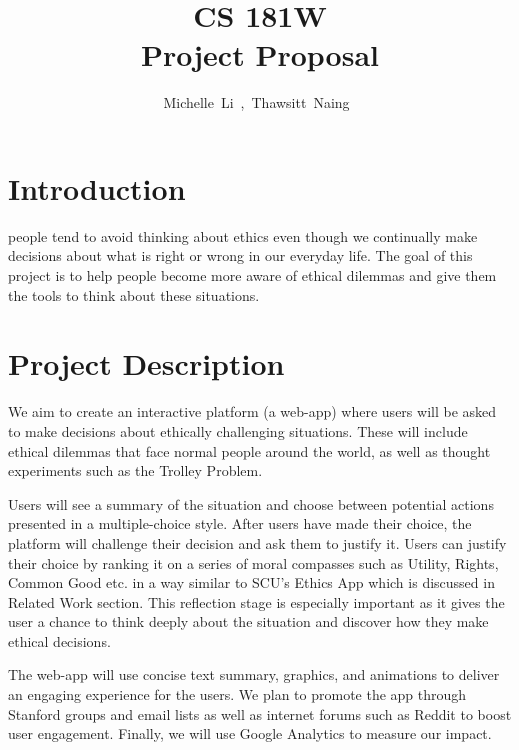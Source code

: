 \documentclass[12pt,journal,compsoc]{IEEEtran}
\begin{document}
\title{CS 181W \\ Project Proposal}

\author{Michelle~Li~,~Thawsitt~Naing~}


%
{}

\maketitle


\section{Introduction}

 people tend to avoid thinking about ethics even though we continually make decisions about what is right or wrong in our everyday life. The goal of this project is to help people become more aware of ethical dilemmas and give them the tools to think about these situations.


\section{Project Description}
We aim to create an interactive platform (a web-app) where users will be asked to make decisions about ethically challenging situations. These will include ethical dilemmas that face normal people around the world, as well as thought experiments such as the Trolley Problem. 

Users will see a summary of the situation and choose between potential actions presented in a multiple-choice style. After users have made their choice, the platform will challenge their decision and ask them to justify it. Users can justify their choice by ranking it on a series of moral compasses such as Utility, Rights, Common Good etc. in a way similar to SCU’s Ethics App which is discussed in Related Work section. This reflection stage is especially important as it gives the user a chance to think deeply about the situation and discover how they make ethical decisions.

The web-app will use concise text summary, graphics, and animations to deliver an engaging experience for the users. We plan to promote the app through Stanford groups and email lists as well as internet forums such as Reddit to boost user engagement. Finally, we will use Google Analytics to measure our impact.
\end{document}
